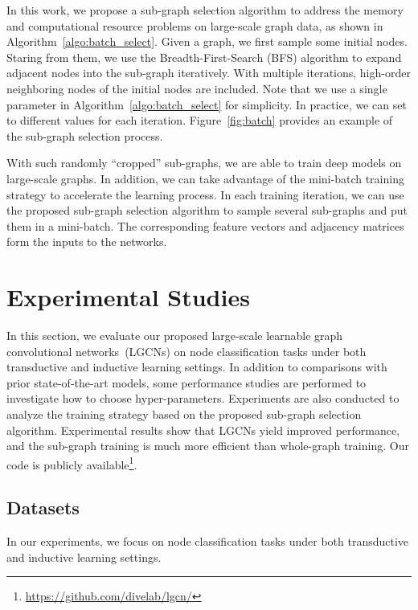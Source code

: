 \documentclass[sigconf]{acmart}
\begin{document}
In this work, we propose a sub-graph selection algorithm to address
the memory and computational resource problems on large-scale graph
data, as shown in Algorithm~\ref{algo:batch_select}. Given a graph,
we first sample some initial nodes. Staring from them, we use the
Breadth-First-Search (BFS) algorithm to expand adjacent nodes into
the sub-graph iteratively. With multiple iterations, high-order
neighboring nodes of the initial nodes are included. Note that we
use a single parameter  in Algorithm~\ref{algo:batch_select}
for simplicity. In practice, we can set  to different values
for each iteration. Figure~\ref{fig:batch} provides an example of
the sub-graph selection process.


With such randomly ``cropped'' sub-graphs, we are able to train deep models on
large-scale graphs. In addition, we can take advantage of the mini-batch
training strategy to accelerate the learning process. In each training
iteration, we can use the proposed sub-graph selection algorithm to sample several
sub-graphs and put them in a mini-batch. The corresponding feature vectors and
adjacency matrices form the inputs to the networks.


\section{Experimental Studies}


In this section, we evaluate our proposed large-scale learnable
graph convolutional networks~(LGCNs) on node classification tasks
under both transductive and inductive learning settings. In addition
to comparisons with prior state-of-the-art models, some performance
studies are performed to investigate how to choose hyper-parameters.
Experiments are also conducted to analyze the training strategy
based on the proposed sub-graph selection algorithm. Experimental
results show that LGCNs yield improved performance, and the
sub-graph training is much more efficient than whole-graph training.
Our code is publicly
available\footnote{\url{https://github.com/divelab/lgcn/}}.


\subsection{Datasets}


In our experiments, we focus on node classification tasks under both
transductive and inductive learning settings.
\end{document}
